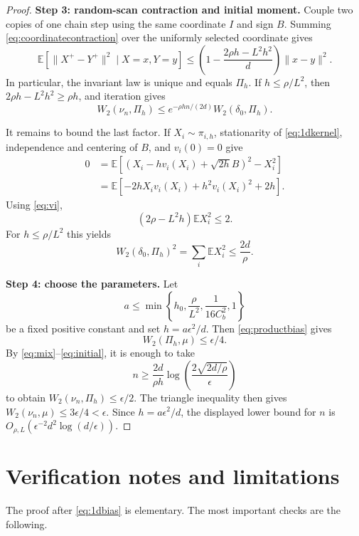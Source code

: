 \documentclass[11pt]{article}
\newcommand{\E}{\mathbb E}
\newcommand{\W}{W_2}
\begin{document}
\begin{proof}
\textbf{Step 3: random-scan contraction and initial moment.}
Couple two copies of one chain step using the same coordinate $I$ and sign
$B$. Summing \eqref{eq:coordinatecontraction} over the uniformly selected
coordinate gives
\begin{equation}\label{eq:scancontract}
 \E[\|X^+-Y^+\|^2\mid X=x,Y=y]
 \leq\left(1-\frac{2\rho h-L^2h^2}{d}\right)\|x-y\|^2.
\end{equation}
In particular, the invariant law is unique and equals $\Pi_h$. If
$h\leq\rho/L^2$, then $2\rho h-L^2h^2\geq\rho h$, and iteration gives
\begin{equation}\label{eq:mix}
 \W(\nu_n,\Pi_h)
 \leq e^{-\rho hn/(2d)}\W(\delta_0,\Pi_h).
\end{equation}

It remains to bound the last factor. If $X_i\sim\pi_{i,h}$, stationarity of
\eqref{eq:1dkernel}, independence and centering of $B$, and $v_i(0)=0$ give
\begin{align*}
 0
 &=\E[(X_i-hv_i(X_i)+\sqrt{2h}B)^2-X_i^2]\\
 &=\E[-2hX_iv_i(X_i)+h^2v_i(X_i)^2+2h].
\end{align*}
Using \eqref{eq:vi},
\[
 (2\rho-L^2h)\E X_i^2\leq2.
\]
For $h\leq\rho/L^2$ this yields
\begin{equation}\label{eq:initial}
 \W(\delta_0,\Pi_h)^2
 =\sum_i\E X_i^2\leq\frac{2d}{\rho}.
\end{equation}

\textbf{Step 4: choose the parameters.}
Let
\[
 a\leq\min\left\{h_0,\frac{\rho}{L^2},
                    \frac{1}{16C_b^2},1\right\}
\]
be a fixed positive constant and set $h=a\epsilon^2/d$. Then
\eqref{eq:productbias} gives
\[
 \W(\Pi_h,\mu)\leq\epsilon/4.
\]
By \eqref{eq:mix}--\eqref{eq:initial}, it is enough to take
\[
 n\geq\frac{2d}{\rho h}
 \log\!\left(\frac{2\sqrt{2d/\rho}}{\epsilon}\right)
\]
to obtain $\W(\nu_n,\Pi_h)\leq\epsilon/2$. The triangle inequality then
gives $\W(\nu_n,\mu)\leq3\epsilon/4<\epsilon$. Since
$h=a\epsilon^2/d$, the displayed lower bound for $n$ is
$O_{\rho,L}(\epsilon^{-2}d^2\log(d/\epsilon))$.
\end{proof}

\section{Verification notes and limitations}

The proof after \eqref{eq:1dbias} is elementary. The most important checks
are the following.
\end{document}
